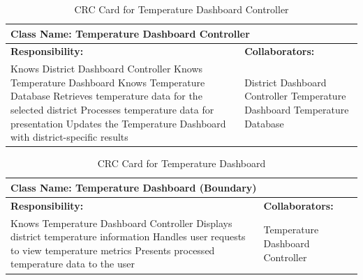 \documentclass[]{article}
\begin{document}
\begin{table}[H]
    \centering
    \caption{CRC Card for Temperature Dashboard Controller}
    \vspace{1mm}
    \begin{tabular}{|p{7.5cm}|p{7.5cm}|}
    \hline 
    \multicolumn{2}{|l|}{\textbf{Class Name: Temperature Dashboard Controller}} \\
    \hline
    \textbf{Responsibility:} & \textbf{Collaborators:} \\
    \hline
        Knows District Dashboard Controller \newline
        Knows Temperature Dashboard \newline
        Knows Temperature Database \newline
        Retrieves temperature data for the selected district \newline
        Processes temperature data for presentation \newline
        Updates the Temperature Dashboard with district-specific results \newline
        &
        District Dashboard Controller \newline
        Temperature Dashboard \newline
        Temperature Database \\
    \hline
    \end{tabular}
\end{table}
\begin{table}[H]
    \centering
    \caption{CRC Card for Temperature Dashboard}
    \vspace{1mm}
    \begin{tabular}{|p{7.5cm}|p{7.5cm}|}
    \hline 
    \multicolumn{2}{|l|}{\textbf{Class Name: Temperature Dashboard (Boundary)}} \\
    \hline
    \textbf{Responsibility:} & \textbf{Collaborators:} \\
    \hline
        Knows Temperature Dashboard Controller \newline
        Displays district temperature information \newline
        Handles user requests to view temperature metrics \newline
        Presents processed temperature data to the user \newline
        &
        Temperature Dashboard Controller \\
    \hline
    \end{tabular}
\end{table}
\end{document}
